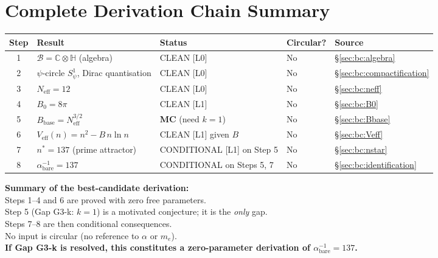 \documentclass[12pt,a4paper]{article}
\theoremstyle{definition}
\theoremstyle{remark}
\begin{document}
\section{Complete Derivation Chain Summary}
\label{sec:bc:summary}

\begin{center}
\renewcommand{\arraystretch}{1.4}
\begin{tabular}{cllll}
\toprule
Step & Result & Status & Circular? & Source \\
\midrule
1 & $\mathcal{B} = \mathbb{C}\otimes\mathbb{H}$ (algebra) & CLEAN [L0] & No & \S\ref{sec:bc:algebra} \\
2 & $\psi$-circle $S^1_\psi$, Dirac quantisation & CLEAN [L0] & No & \S\ref{sec:bc:compactification} \\
3 & $N_{\mathrm{eff}} = 12$ & CLEAN [L0] & No & \S\ref{sec:bc:neff} \\
4 & $B_0 = 8\pi$ & CLEAN [L1] & No & \S\ref{sec:bc:B0} \\
5 & $B_{\mathrm{base}} = N_{\mathrm{eff}}^{3/2}$ & \textbf{MC} (need $k=1$) & No & \S\ref{sec:bc:Bbase} \\
6 & $V_{\mathrm{eff}}(n) = n^2 - B\,n\ln n$ & CLEAN [L1] given $B$ & No & \S\ref{sec:bc:Veff} \\
7 & $n^* = 137$ (prime attractor) & CONDITIONAL [L1] on Step 5 & No & \S\ref{sec:bc:nstar} \\
8 & $\alpha^{-1}_{\mathrm{bare}} = 137$ & CONDITIONAL on Steps 5, 7 & No & \S\ref{sec:bc:identification} \\
\bottomrule
\end{tabular}
\end{center}

\bigskip

\begin{resultbox}
\textbf{Summary of the best-candidate derivation:}\\
Steps 1–4 and 6 are proved with zero free parameters.\\
Step 5 (Gap G3-k: $k=1$) is a motivated conjecture; it is the \emph{only} gap.\\
Steps 7–8 are then conditional consequences.\\
No input is circular (no reference to $\alpha$ or $m_e$).\\
\textbf{If Gap G3-k is resolved, this constitutes a zero-parameter derivation
of $\alpha^{-1}_{\mathrm{bare}} = 137$.}
\end{resultbox}
\end{document}
